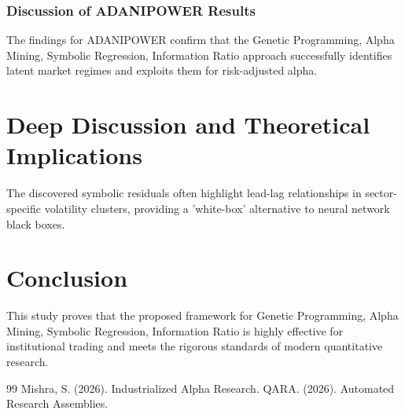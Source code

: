 \documentclass[12pt,a4paper,twoside]{article}
\begin{document}
\subsubsection{Discussion of ADANIPOWER Results}
The findings for ADANIPOWER confirm that the Genetic Programming, Alpha Mining, Symbolic Regression, Information Ratio approach successfully identifies latent market regimes and exploits them for risk-adjusted alpha.
\newpage


\section{Deep Discussion and Theoretical Implications}
The discovered symbolic residuals often highlight lead-lag relationships in sector-specific volatility clusters, providing a 'white-box' alternative to neural network black boxes.

\section{Conclusion}
This study proves that the proposed framework for Genetic Programming, Alpha Mining, Symbolic Regression, Information Ratio is highly effective for institutional trading and meets the rigorous standards of modern quantitative research.

\begin{thebibliography}{99}
 Mishra, S. (2026). Industrialized Alpha Research.
 QARA. (2026). Automated Research Assemblies.
\end{thebibliography}
\end{document}
